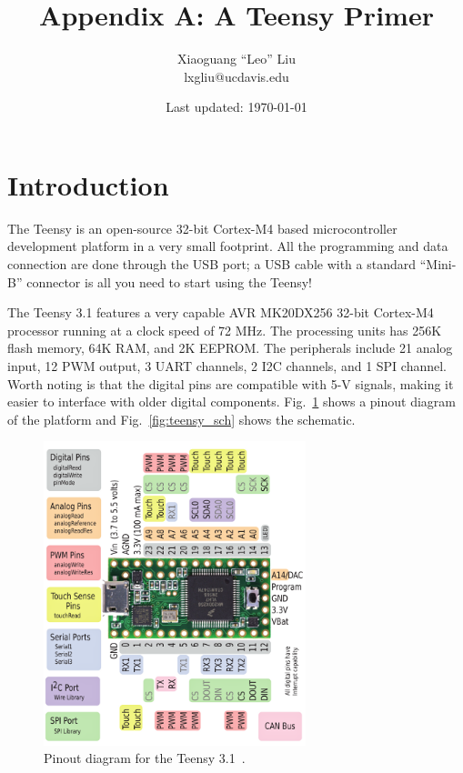 \documentclass[letterpaper, 11pt]{article}
\begin{document}
\title{Appendix A: A Teensy Primer}
\author{Xiaoguang ``Leo'' Liu\\lxgliu@ucdavis.edu}
\date{Last updated: \today}

\maketitle

\section{Introduction}
The Teensy is an open-source 32-bit Cortex-M4 based microcontroller development platform in a very small footprint. All the programming and data connection are done through the USB port; a USB cable with a standard ``Mini-B'' connector is all you need to start using the Teensy!

The Teensy 3.1 features a very capable AVR MK20DX256 32-bit Cortex-M4 processor running at a clock speed of 72 MHz. The processing units has 256K flash memory, 64K RAM, and 2K EEPROM. The peripherals include 21 analog input, 12 PWM output, 3 UART channels, 2 I2C channels, and 1 SPI channel. Worth noting is that the digital pins are compatible with 5-V signals, making it easier to interface with older digital components. Fig.~\ref{fig:teensy_pinout} shows a pinout diagram of the platform and Fig.~\ref{fig:teensy_sch} shows the schematic.  

\begin{figure}[ht]
	\centering
	\includegraphics[width=3in]{teensy_pinout.png}
	\caption{Pinout diagram for the Teensy 3.1~\cite{bib:teensy_pinout}.}
	\label{fig:teensy_pinout}
\end{figure}
\end{document}
